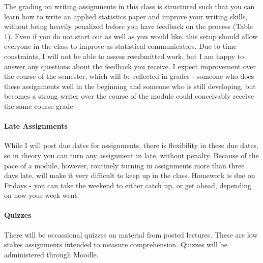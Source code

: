 \documentclass[11pt]{article}
\begin{document}
The grading on writing assignments in this class is structured such that you can learn how to write an applied statistics paper and improve your writing skills, without being heavily penalized before you have feedback on the process (Table 1). Even if you do not start out as well as you would like, this setup should allow everyone in the class to improve as statistical communicators. Due to time constraints, I will not be able to assess resubmitted work, but I am happy to answer any questions about the feedback you receive. I expect improvement over the course of the semester, which will be reflected in grades - someone who does these assignments well in the beginning and someone who is still developing, but becomes a strong writer over the course of the module could conceivably receive the same course grade.

\paragraph{Late Assignments} 
While I will post due dates for assignments, there is flexibility in these due dates, so in theory you can turn any assignment in late, without penalty. Because of the pace of a module, however, routinely turning in assignments more than three days late, will make it very difficult to keep up in the class. Homework is due on Fridays - you can take the weekend to either catch up, or get ahead, depending on how your week went.

\paragraph{Quizzes}
There will be occassional quizzes on material from posted lectures. These are low stakes assignments intended to measure comprehension. Quizzes will be administered through Moodle. 
\end{document}

